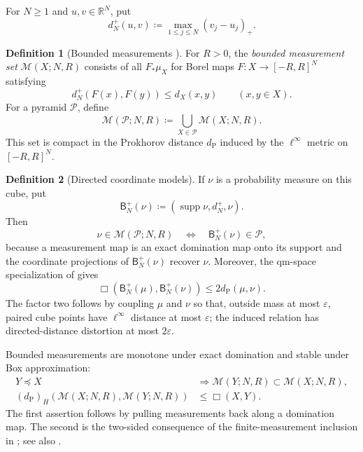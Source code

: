 \documentclass{amsart}
\numberwithin{equation}{section}
\theoremstyle{plain}
\theoremstyle{definition}
\newtheorem*{definition*}{Definition}
\theoremstyle{remark}
\newcommand{\R}{\mathbb R}
\DeclareMathOperator{\supp}{supp}
\newcommand{\eps}{\varepsilon}
\begin{document}
For $N\ge1$ and $u,v\in\R^N$, put
\begin{equation}\label{eq:directed-cube-distance} d_N^+(u,v)\coloneqq\max_{1\le j\le N}(v_j-u_j)_+. \end{equation}
\begin{definition*}[Bounded measurements {\cite[Definition~4.1]{gds3-ja}}]
For $R>0$, the \emph{bounded measurement set} $\mathcal M(X;N,R)$ consists of all $F_*\mu_X$ for Borel maps $F\colon X\to[-R,R]^N$ satisfying
\begin{equation}\label{eq:bounded-measurement-condition} d_N^+(F(x),F(y))\le d_X(x,y) \qquad(x,y\in X). \end{equation}
For a pyramid $\mathcal P$, define
\begin{equation}\label{eq:pyramid-bounded-measurement} \mathcal M(\mathcal P;N,R)\coloneqq\bigcup_{X\in\mathcal P}\mathcal M(X;N,R). \end{equation}
This set is compact in the Prokhorov distance $d_{\mathrm P}$ induced by the $\ell^\infty$ metric on $[-R,R]^N$.
\end{definition*}

\begin{definition*}[Directed coordinate models]
If $\nu$ is a probability measure on this cube, put
\[ \mathsf B_N^+(\nu)\coloneqq(\supp\nu,d_N^+,\nu). \]
Then
\begin{equation}\label{eq:coordinate-model-membership} \nu\in\mathcal M(\mathcal P;N,R)\quad\Longleftrightarrow\quad\mathsf B_N^+(\nu)\in\mathcal P, \end{equation}
because a measurement map is an exact domination map onto its support and the coordinate projections of $\mathsf B_N^+(\nu)$ recover $\nu$.  Moreover, the qm-space specialization of \cite[Lemma~B.1]{gds3-ja} gives
\begin{equation}\label{eq:coordinate-model-box} \Box(\mathsf B_N^+(\mu),\mathsf B_N^+(\nu))\le2d_{\mathrm P}(\mu,\nu). \end{equation}
The factor two follows by coupling $\mu$ and $\nu$ so that, outside mass at most $\eps$, paired cube points have $\ell^\infty$ distance at most $\eps$; the induced relation has directed-distance distortion at most $2\eps$.
\end{definition*}

Bounded measurements are monotone under exact domination and stable under Box approximation:
\begin{equation}\label{eq:measurement-box-stability}
\begin{aligned}
Y\preceq X&\Longrightarrow\mathcal M(Y;N,R)\subset\mathcal M(X;N,R),\\
(d_{\mathrm P})_H(\mathcal M(X;N,R),\mathcal M(Y;N,R))&\le\Box(X,Y).
\end{aligned}
\end{equation}
The first assertion follows by pulling measurements back along a domination map.  The second is the two-sided consequence of the finite-measurement inclusion in \cite[Proposition~3.9]{one-sided-pyramids}; see also \cite[Lemma~B.2]{gds3-ja}.
\end{document}
